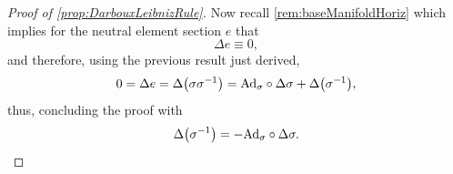 \documentclass[reqno,a4paper,oneside]{amsart}
\newcommand\mutot{\mu_\caG}
\theoremstyle{plain}
\theoremstyle{remark}
\theoremstyle{definition}
\def\bas#1\eas{\begin{align*}#1\end{align*}}
\begin{document}
\begin{proof}[Proof of \ref{prop:DarbouxLeibnizRule}]
%
Now recall \ref{rem:baseManifoldHoriz} which implies for the neutral element section $e$ that
\begin{equation*}
\Delta e
\equiv
0,
\end{equation*}
and therefore, using the previous result just derived,
\begin{equation*}
0
=
\Delta e
=
\Delta \mleft( \sigma \sigma^{-1} \mright)
=
\mathrm{Ad}_{\sigma} \circ \Delta \sigma
	+ \Delta\mleft(\sigma^{-1}\mright),
\end{equation*}
thus, concluding the proof with
\begin{equation*}
\Delta\mleft(\sigma^{-1}\mright)
=
- \mathrm{Ad}_{\sigma} \circ \Delta \sigma.
\end{equation*}
\end{proof}
\end{document}
